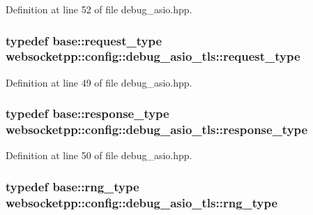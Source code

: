 Definition at line 52 of file debug\+\_\+asio.\+hpp.

\hypertarget{structwebsocketpp_1_1config_1_1debug__asio__tls_ac3023568109156bf336d2c5cd6ba2cd7}{}
\subsubsection[{request\+\_\+type}]{\setlength{\rightskip}{0pt plus 5cm}typedef {\bf base\+::request\+\_\+type} {\bf websocketpp\+::config\+::debug\+\_\+asio\+\_\+tls\+::request\+\_\+type}}\label{structwebsocketpp_1_1config_1_1debug__asio__tls_ac3023568109156bf336d2c5cd6ba2cd7}


Definition at line 49 of file debug\+\_\+asio.\+hpp.

\hypertarget{structwebsocketpp_1_1config_1_1debug__asio__tls_ae6a55da5913e5fd46997233da3c31c0b}{}
\subsubsection[{response\+\_\+type}]{\setlength{\rightskip}{0pt plus 5cm}typedef {\bf base\+::response\+\_\+type} {\bf websocketpp\+::config\+::debug\+\_\+asio\+\_\+tls\+::response\+\_\+type}}\label{structwebsocketpp_1_1config_1_1debug__asio__tls_ae6a55da5913e5fd46997233da3c31c0b}


Definition at line 50 of file debug\+\_\+asio.\+hpp.

\hypertarget{structwebsocketpp_1_1config_1_1debug__asio__tls_a31ca397251fac66cfe514e48802e3182}{}
\subsubsection[{rng\+\_\+type}]{\setlength{\rightskip}{0pt plus 5cm}typedef {\bf base\+::rng\+\_\+type} {\bf websocketpp\+::config\+::debug\+\_\+asio\+\_\+tls\+::rng\+\_\+type}}\label{structwebsocketpp_1_1config_1_1debug__asio__tls_a31ca397251fac66cfe514e48802e3182}


